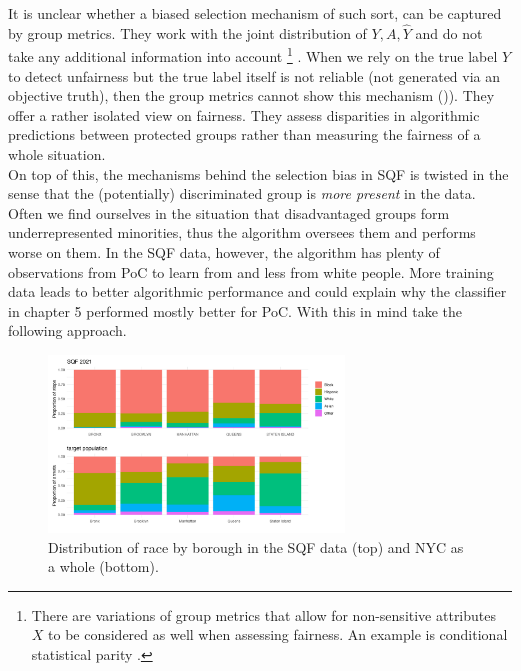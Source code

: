 It is unclear whether a biased selection mechanism of such sort, can be captured by group metrics. They work with the joint distribution of $Y, A, \hat{Y}$ and do not take any additional information into account \footnote{There are variations of group metrics that allow for non-sensitive attributes $X$ to be considered as well when assessing fairness. An example is conditional statistical parity \cite{verma2018}.} . When we rely on the true label $Y$ to detect unfairness but the true label itself is not reliable (not generated via an objective truth), then the group metrics cannot show this mechanism ()\cite{castelnovo2022}). They offer a rather isolated view on fairness. They assess disparities in algorithmic predictions between protected groups rather than measuring the fairness of a whole situation.\\
On top of this, the mechanisms behind the selection bias in SQF is twisted in the sense that the (potentially) discriminated group is \textit{more present} in the data. Often we find ourselves in the situation that disadvantaged groups form underrepresented minorities, thus the algorithm oversees them and performs worse on them. In the SQF data, however, the algorithm has plenty of observations from PoC to learn from and less from white people. More training data leads to better algorithmic performance and could explain why the classifier in chapter 5 performed mostly better for PoC. With this in mind \cite{kallus2018} take the following approach.\\


\begin{figure}
    \centering
    \includegraphics[width=0.7\textwidth]{../figures/sqf_case_study_plot11.png}
    \caption {Distribution of race by borough in the SQF data (top) and NYC as a whole (bottom).}
    \label{fig:borough_race_distribution}
\end{figure}


